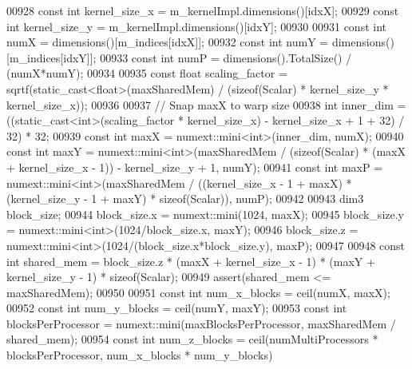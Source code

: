 \begin{DoxyCode}
00928         \textcolor{keyword}{const} \textcolor{keywordtype}{int} kernel\_size\_x = m\_kernelImpl.dimensions()[idxX];
00929         \textcolor{keyword}{const} \textcolor{keywordtype}{int} kernel\_size\_y = m\_kernelImpl.dimensions()[idxY];
00930 
00931         \textcolor{keyword}{const} \textcolor{keywordtype}{int} numX = dimensions()[m\_indices[idxX]];
00932         \textcolor{keyword}{const} \textcolor{keywordtype}{int} numY = dimensions()[m\_indices[idxY]];
00933         \textcolor{keyword}{const} \textcolor{keywordtype}{int} numP = dimensions().TotalSize() / (numX*numY);
00934 
00935         \textcolor{keyword}{const} \textcolor{keywordtype}{float} scaling\_factor = sqrtf(static\_cast<float>(maxSharedMem) / (\textcolor{keyword}{sizeof}(Scalar) * 
      kernel\_size\_y * kernel\_size\_x));
00936 
00937         \textcolor{comment}{// Snap maxX to warp size}
00938         \textcolor{keywordtype}{int} inner\_dim = ((\textcolor{keyword}{static\_cast<}\textcolor{keywordtype}{int}\textcolor{keyword}{>}(scaling\_factor * kernel\_size\_x) - kernel\_size\_x + 1 + 32) / 32) 
      * 32;
00939         \textcolor{keyword}{const} \textcolor{keywordtype}{int} maxX = numext::mini<int>(inner\_dim, numX);
00940         \textcolor{keyword}{const} \textcolor{keywordtype}{int} maxY = numext::mini<int>(maxSharedMem / (\textcolor{keyword}{sizeof}(Scalar) * (maxX + kernel\_size\_x - 1)) - 
      kernel\_size\_y + 1, numY);
00941         \textcolor{keyword}{const} \textcolor{keywordtype}{int} maxP = numext::mini<int>(maxSharedMem / ((kernel\_size\_x - 1 + maxX) * (kernel\_size\_y - 1 
      + maxY) * \textcolor{keyword}{sizeof}(Scalar)), numP);
00942 
00943         dim3 block\_size;
00944         block\_size.x = numext::mini(1024, maxX);
00945         block\_size.y = numext::mini<int>(1024/block\_size.x, maxY);
00946         block\_size.z = numext::mini<int>(1024/(block\_size.x*block\_size.y), maxP);
00947 
00948         \textcolor{keyword}{const} \textcolor{keywordtype}{int} shared\_mem = block\_size.z * (maxX + kernel\_size\_x - 1) * (maxY + kernel\_size\_y - 1) * \textcolor{keyword}{
      sizeof}(Scalar);
00949         assert(shared\_mem <= maxSharedMem);
00950 
00951         \textcolor{keyword}{const} \textcolor{keywordtype}{int} num\_x\_blocks = ceil(numX, maxX);
00952         \textcolor{keyword}{const} \textcolor{keywordtype}{int} num\_y\_blocks = ceil(numY, maxY);
00953         \textcolor{keyword}{const} \textcolor{keywordtype}{int} blocksPerProcessor = numext::mini(maxBlocksPerProcessor, maxSharedMem / shared\_mem);
00954         \textcolor{keyword}{const} \textcolor{keywordtype}{int} num\_z\_blocks = ceil(numMultiProcessors * blocksPerProcessor, num\_x\_blocks * num\_y\_blocks)

\end{DoxyCode}
